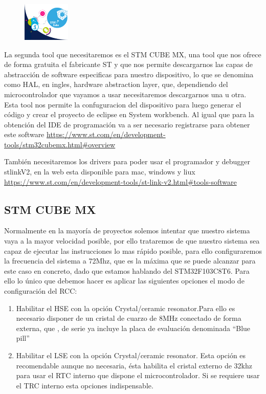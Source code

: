\documentclass[10pt,a4paper,oneside]{article}
\begin{document}
\begin{figure}
    \centering
    \includegraphics[width=0.2\textwidth]{Imagenes/STM32CubeMX.png}
\end{figure}

La segunda tool que necesitaremos es el STM CUBE MX, una tool que nos ofrece de forma gratuita el fabricante ST y que nos permite descargarnos las capas de abstracción de software especificas para nuestro dispositivo, lo que se denomina como HAL, en ingles, hardware abstraction layer, que, dependiendo del microcontrolador que vayamos a usar necesitaremos descargarnos una u otra. Esta tool nos permite la confuguracion del dispositivo para luego generar el código y crear el proyecto de eclipse en System workbench. Al igual que para la obtención del IDE de programación va a ser necesario registrarse para obtener este software \url{https://www.st.com/en/development-tools/stm32cubemx.html#overview}

También necesitaremos los drivers para poder usar el programador y debugger stlinkV2, en la web esta disponible para mac, windows y liux \url{https://www.st.com/en/development-tools/st-link-v2.html#tools-software} 

\subsection{STM CUBE MX}%
Normalmente en la mayoría de proyectos solemos intentar que nuestro sistema vaya a la mayor velocidad posible, por ello trataremos de que nuestro sistema sea capaz de ejecutar las instrucciones lo mas rápido posible, para ello configuraremos la frecuencia del sistema a 72Mhz, que es la máxima que se puede alcanzar para este caso en concreto, dado que estamos hablando del STM32F103C8T6.
Para ello lo único que debemos hacer es aplicar las siguientes opciones el modo de configuración del RCC:

\begin{enumerate}
	\item Habilitar el HSE con la opción Crystal/ceramic resonator.Para ello es necesario disponer de un cristal de cuarzo de 8MHz conectado de forma externa, que , de serie ya incluye la placa de evaluación denominada "`Blue pill"'    
	\item Habilitar el LSE con la opción Crystal/ceramic resonator. Esta opción es recomendable aunque no necesaria, ésta habilita el cristal externo de 32khz para usar el RTC interno que dispone el microcontrolador. Si se requiere usar el TRC interno esta opciones indispensable.  
\end{enumerate}
\end{document}
